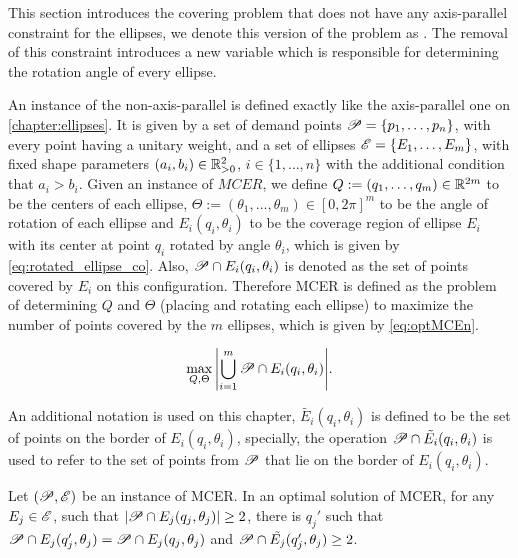 This section introduces the covering problem that does not have any axis-parallel constraint for the ellipses, we denote this version of the problem as . The removal of this constraint introduces a new variable which is responsible for determining the rotation angle of every ellipse.

An instance of the non-axis-parallel is defined exactly like the axis-parallel one on \autoref{chapter:ellipses}. It is given by a set of demand points $\mathscr{P}=\{p_1, \dots, p_n\}$, with every point having a unitary weight, and a set of ellipses $\mathscr{E}=\{E_1, \dots, E_m\}$, with fixed shape parameters $(a_i, b_i) \in \mathbb{R}^2_{>0}$, $i \in \{1, \dots, n\}$ with the additional condition that $a_i > b_i$. Given an instance of $MCER$, we define $Q:=(q_1, \dots, q_m) \in \mathbb{R}^{2m}$ to be the centers of each ellipse, $\Theta:=(\theta_1, \dots, \theta_m) \in [0, 2\pi]^m$ to be the angle of rotation of each ellipse and $E_i(q_i, \theta_i)$ to be the coverage region of ellipse $E_i$ with its center at point $q_i$ rotated by angle $\theta_i$, which is given by \autoref{eq:rotated_ellipse_co}.
Also, $\mathscr{P} \cap E_i(q_i, \theta_i)$ is denoted as the set of points covered by $E_i$ on this configuration. Therefore MCER is defined as the problem of determining $Q$ and $\Theta$ (placing and rotating each ellipse) to maximize the number of points covered by the $m$ ellipses, which is given by \autoref{eq:optMCEn}.

\begin{equation}\label{eq:optMCEn}
\max_{Q, \Theta}{\left|\bigcup_{i=1}^{m} \mathscr{P} \cap E_i(q_i, \theta_i)\right|}.
\end{equation}

An additional notation is used on this chapter, $\tilde{E_i}(q_i, \theta_i)$ is defined to be the set of points on the border of $E_i(q_i, \theta_i)$, specially, the operation $\mathscr{P} \cap \tilde{E_i}(q_i, \theta_i)$ is used to refer to the set of points from $\mathscr{P}$ that lie on the border of $E_i(q_i, \theta_i)$.


\begin{lema}\label{lema:mce_2b}
	Let $(\mathscr{P}, \mathscr{E})$ be an instance of MCER. In an optimal solution of MCER, for any $E_j \in \mathscr{E}$, such that $|\mathscr{P} \cap E_j(q_j, \theta_j)|\ge2$, there is $q_j'$ such that $\mathscr{P} \cap E_j(q_j', \theta_j)=\mathscr{P} \cap E_j(q_j, \theta_j)$ and $\mathscr{P} \cap \tilde{E_j}(q_j', \theta_j) \ge 2$.
\end{lema}

